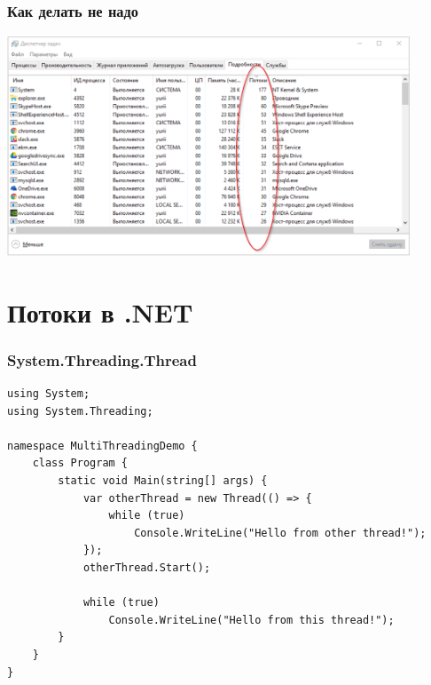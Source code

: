 \documentclass[xetex,mathserif,serif]{beamer}
\begin{document}
	\begin{frame}
		\frametitle{Как делать не надо}
		\begin{center}
			\includegraphics[width=0.9\textwidth]{threadsEverywhere.png}
		\end{center}
	\end{frame}

	\section{Потоки в .NET}

	\begin{frame}[fragile]
		\frametitle{System.Threading.Thread}
		\begin{footnotesize}
			\begin{verbatim}
using System;
using System.Threading;

namespace MultiThreadingDemo {
    class Program {
        static void Main(string[] args) {
            var otherThread = new Thread(() => {
                while (true)
                    Console.WriteLine("Hello from other thread!");
            });
            otherThread.Start();

            while (true)
                Console.WriteLine("Hello from this thread!");
        }
    }
}
			\end{verbatim}
		\end{footnotesize}
	\end{frame}
\end{document}
